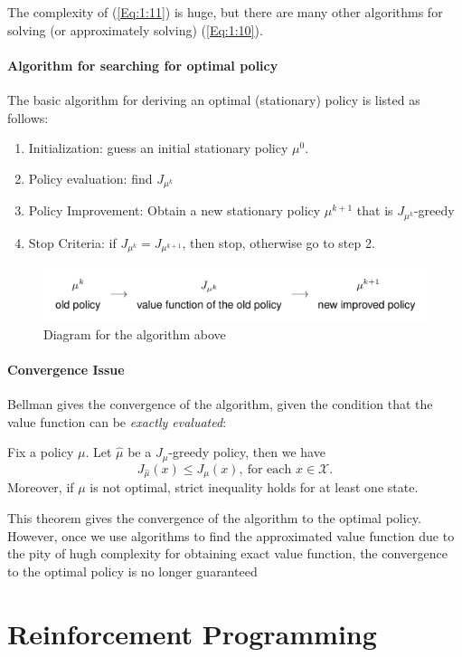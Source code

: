 The complexity of (\ref{Eq:1:11}) is huge, but there are many other algorithms for solving (or approximately solving) (\ref{Eq:1:10}).

\paragraph{Algorithm for searching for optimal policy}
The basic algorithm for deriving an optimal (stationary) policy is listed as follows:
\begin{enumerate}
\item
Initialization: guess an initial stationary policy $\mu^0$.
\item
Policy evaluation: find $J_{\mu^k}$
\item
Policy Improvement: Obtain a new stationary policy $\mu^{k+1}$ that is $J_{\mu^k}$-greedy
\item
Stop Criteria: if $J_{\mu^k}=J_{\mu^{k+1}}$, then stop, otherwise go to step 2.
\end{enumerate}
\begin{figure}[H]
\centering
\includegraphics[width=1\textwidth]{First_lecture/p_1}
\caption{Diagram for the algorithm above}
\end{figure}
\paragraph{Convergence Issue}
Bellman gives the convergence of the algorithm, given the condition that the value function can be \emph{exactly evaluated}:
\begin{theorem}
Fix a policy $\mu$. Let $\hat{\mu}$ be a $J_\mu$-greedy policy, then we have
\[
J_{\hat \mu}(x)\le J_\mu(x),\ \text{for each }x\in\mathcal{X}.
\]
Moreover, if $\mu$ is not optimal, strict inequality holds for at least one state.
\end{theorem}
\begin{remark}
This theorem gives the convergence of the algorithm to the optimal policy. However, once we use algorithms to find the approximated value function due to the pity of hugh complexity for obtaining exact value function, the convergence to the optimal policy is no longer guaranteed
\end{remark}
\section{Reinforcement Programming}

